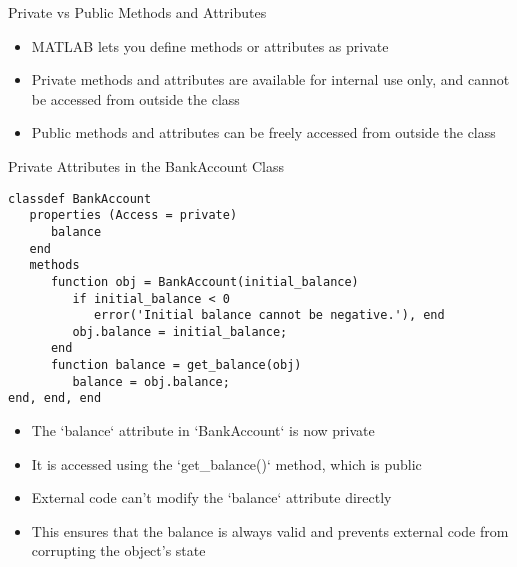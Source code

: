 \documentclass[handout]{beamer}
\begin{document}
\begin{frame}[fragile]{Private vs Public Methods and Attributes}
  \begin{itemize}
    \item MATLAB lets you define methods or attributes as private
    \item Private methods and attributes are available for internal use only, and cannot be accessed from outside the class
    \item Public methods and attributes can be freely accessed from outside the class
  \end{itemize}
\end{frame}

\begin{frame}[fragile]{Private Attributes in the BankAccount Class}
\begin{lstlisting}[style=Matlab]
classdef BankAccount
   properties (Access = private)
      balance
   end
   methods
      function obj = BankAccount(initial_balance)
         if initial_balance < 0
            error('Initial balance cannot be negative.'), end
         obj.balance = initial_balance;
      end
      function balance = get_balance(obj)
         balance = obj.balance;
end, end, end
\end{lstlisting}

  \begin{itemize}
    \item The `balance` attribute in `BankAccount` is now private
    \item It is accessed using the `get\_balance()` method, which is public
    \item External code can't modify the `balance` attribute directly
    \item This ensures that the balance is always valid and prevents external code from corrupting the object's state
  \end{itemize}
\end{frame}
\end{document}
